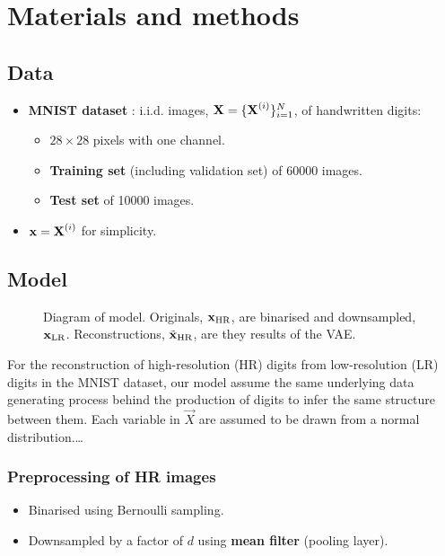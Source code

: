 \section{Materials and methods}
\label{sec:method}

\subsection{Data}
\label{sub:data}
\begin{itemize}
	\item \textbf{MNIST dataset} \cite{MNIST}: i.i.d. images, $\bm{\mathrm{X}} = \{\bm{\mathrm{X}}^{(i)}\}^N_{i=1}$, of handwritten digits:
	\begin{itemize}
		\item $28 \times 28$ pixels with one channel.
		\item \textbf{Training set} (including validation set) of 60000 images.
		\item \textbf{Test set} of 10000 images.
	\end{itemize}
	\item $\bm{\mathrm{x}} = \bm{\mathrm{X}}^{(i)}$ for simplicity.
\end{itemize}

\subsection{Model}
\label{sub:the_model}

\begin{figure*}
	\centering
	
	\caption{Diagram of model. Originals, $\bm{\mathrm{x}}_{\text{HR}}$, are binarised and downsampled, $\bm{\mathrm{x}}_{\text{LR}}$. Reconstructions, $\tilde{\bm{\mathrm{x}}}_{\text{HR}}$, are they results of the VAE.}
	\label{fig:diagram}
\end{figure*}

For the reconstruction of high-resolution (HR) digits from low-resolution (LR) digits in the MNIST dataset, our model assume the same underlying data generating process behind the production of digits to infer the same structure between them. Each variable in $\vec{X}$ are assumed to be drawn from a normal distribution.\dots 

\subsubsection{Preprocessing of HR images}
\label{ssub:downsampling}

\begin{itemize}
	\item Binarised using Bernoulli sampling.
	\item Downsampled by a factor of $d$ using \textbf{mean filter} (pooling layer).
\end{itemize}


